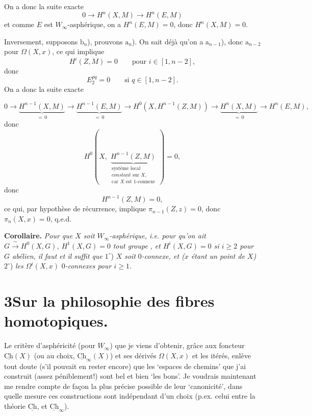 \documentclass[11pt]{article}
\newcommand{\printedpage}[1]{\marginpar{\footnotesize p.~#1}}
\newcommand{\msp}[1]{\marginpar{\footnotesize [#1]}}
\newcommand{\Ch}{\underline{\mathrm{Ch}}}
\begin{document}
\printedpage{126}

On a donc la suite exacte
\[
0 \longrightarrow H^n(X,M) \longrightarrow H^n(E,M)
\]
et comme $E$ est $W_\infty$-asphérique, on a $H^n(E,M) = 0$, donc $H^n(X,M) = 0$.

Inversement, supposons $\mathrm{b}_n$), prouvons $\mathrm{a}_n$). On sait déjà qu'on a $\mathrm{a}_{n-1}$), donc $\mathrm{a}_{n-2}$ pour $\Omega(X,x)$, ce qui implique
\[
H^i(Z,M) = 0 \qquad \text{pour } i \in [1,n-2],
\]
donc
\[
E_2^{pq} = 0 \qquad \text{si } q \in [1,n-2].
\]
On a donc la suite exacte

\msp{page 190}
\[
0 \longrightarrow \underbrace{H^{n-1}(X,M)}_{=\,0} \longrightarrow \underbrace{H^{n-1}(E,M)}_{=\,0} \longrightarrow H^0(X,H^{n-1}(Z,M)) \longrightarrow \underbrace{H^n(X,M)}_{=\,0} \longrightarrow H^n(E,M),
\]
donc
\[
H^0(X,\ \underbrace{H^{n-1}(Z,M)}_{\begin{array}{l}\text{système local}\\ \textit{constant}\text{ sur } X,\\ \text{car } X \text{ est 1-connexe}\end{array}}\ ) = 0,
\]
donc
\[
H^{n-1}(Z,M) = 0,
\]
ce qui, par hypothèse de récurrence, implique $\pi_{n-1}(Z,z) = 0$, donc $\pi_n(X,x) = 0$, q.e.d.

\textbf{Corollaire.} \textit{Pour que $X$ soit $W_\infty$-asphérique, i.e. pour qu'on ait $G \xrightarrow{\ \sim\ } H^0(X,G)$, $H^1(X,G) = 0$} \textit{tout groupe} \textit{, et $H^i(X,G) = 0$ si $i \geq 2$ pour $G$ abélien, il faut et il suffit que} $1^\circ$) \textit{$X$ soit} $0$\textit{-connexe, et ($x$ étant un point de $X$)} $2^\circ$) \textit{les $\Omega^i(X,x)$} $0$\textit{-connexes pour $i \geq 1$.}

\msp{page 191}

\section*{3\quad Sur la philosophie des fibres homotopiques.}

Le critère d'asphéricité (pour $W_\infty$) que je viens d'obtenir, grâce aux foncteur $\Ch(X)$ (ou au choix, $\Ch_\infty(X)$) et ses dérivés $\Omega(X,x)$ et les itérés, enlève tout doute (s'il pouvait en rester encore) que les `espaces de chemins' que j'ai construit (assez péniblement!) sont bel et bien `les bons'. Je voudrais maintenant me rendre compte de façon la plus précise possible de leur `canonicité', dans quelle mesure ces constructions sont indépendant d'un choix (p.ex. celui entre la théorie $\Ch$, et $\Ch_\infty$). %
\end{document}

